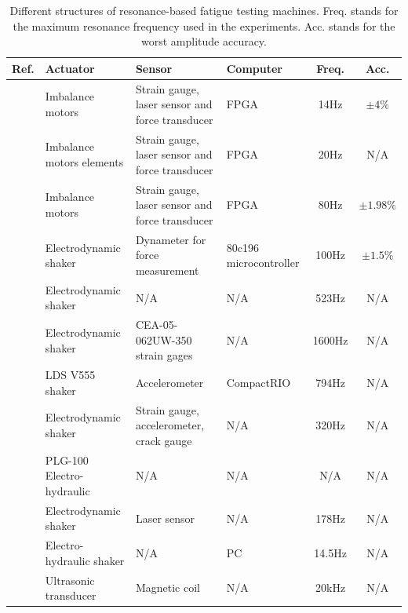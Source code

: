 \documentclass[lettersize,journal]{IEEEtran}
\begin{document}
\begin{table}
    \centering
    \begin{tabular}{|l|l|l|l|c|c|} \hline
     Ref.   &  Actuator  & Sensor & Computer &  Freq. &  Acc. \\ \hline
     \cite{SCHRAMM2024117045}   & Imbalance motors &   Strain gauge, laser sensor and force transducer & FPGA  & 14Hz &    $\pm 4\%$\\ \hline
\cite{SCHNEIDER2018171}   & Imbalance motors elements  &  Strain gauge, laser sensor and force transducer & FPGA  & 20Hz  &   N/A \\  \hline

\cite{herrmann2018simulation_Thesis} & Imbalance motors &   Strain gauge, laser sensor and force transducer  & FPGA   & 80Hz &  $\pm 1.98\%$  \\    \hline

\cite{feng2003development_Japaneese}   & Electrodynamic shaker &  Dynameter for force measurement  & 80c196 microcontroller & 100Hz  &  $\pm 1.5\%$ \\ \hline

\cite{Su2014} & Electrodynamic shaker   & N/A & N/A &  523Hz & N/A   \\ \hline

\cite{George_2006} & Electrodynamic shaker    & CEA-05-062UW-350 strain gages & N/A  &  1600Hz & N/A \\ \hline
\cite{CESNIK20125370} & LDS V555 shaker  &  Accelerometer & CompactRIO &  794Hz &  N/A \\  \hline
\cite{gautrelet2020resonance} & Electrodynamic shaker &  Strain gauge, accelerometer,  crack gauge &  N/A & 320Hz & N/A  \\  \hline 


\cite{Ji_2010} &  PLG-100 Electro-hydraulic & N/A & N/A  &  N/A  & N/A  \\  \hline


\cite{DORANGA2024115368} & Electrodynamic shaker & Laser sensor & N/A  & 178Hz & N/A \\ \hline

\cite{Rouillard_2000} & Electro-hydraulic shaker & N/A & PC & 14.5Hz & N/A \\\hline

\cite{Stanzl01041980_fast_ultrasonic} & Ultrasonic transducer & Magnetic coil  & N/A  & 20kHz & N/A \\
           \hline
    \end{tabular}
    \vspace{0.1cm}
    \caption{Different structures of resonance-based fatigue testing machines. Freq. stands for the maximum resonance frequency used in the experiments. Acc. stands for the worst amplitude accuracy.}
    \label{T_machine_types}
\end{table}
\end{document}
